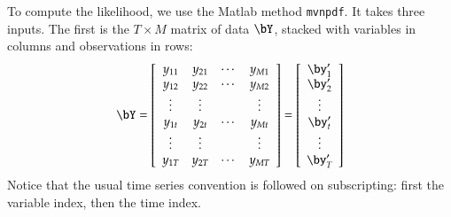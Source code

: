 \documentclass [12pt]{article}
\begin{document}
    To compute the likelihood, we use the Matlab method \texttt{mvnpdf}. It takes three inputs. The first is the $T \times M$ matrix of data $\bY$, stacked with variables in columns and observations in rows:
    \begin{equation}
        \bY = \left[
                \begin{array}{cccc}
                    y_{11} & y_{21} & \cdots & y_{M1} \\
                    y_{12} & y_{22} & \cdots & y_{M2} \\
                    \vdots & \vdots &        & \vdots \\
                    y_{1t} & y_{2t} & \cdots & y_{Mt} \\
                    \vdots & \vdots &        & \vdots \\
                    y_{1T} & y_{2T} & \cdots & y_{MT}
                \end{array}
              \right]
            = \left[
                \begin{array}{c}
                    \by_1' \\
                    \by_2' \\
                    \vdots \\
                    \by_t' \\
                    \vdots \\
                    \by_T'
                \end{array}
              \right]
    \end{equation}
    Notice that the usual time series convention is followed on subscripting: first the variable index, then the time index.
\end{document}
